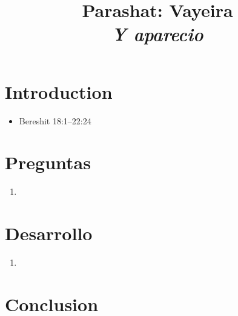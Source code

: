 \documentclass[conference]{IEEEtran}
\title{Parashat: Vayeira\\ \textit{Y aparecio}}
\author{\IEEEauthorblockN{Kunst, James Jules Waldemar}
\IEEEauthorblockA{Bet-Melej Haba}}
\begin{document}
\maketitle


\section{Introduction}
\begin{itemize}
\item
Bereshit 18:1–22:24
\end{itemize}


\section{Preguntas}

\begin{enumerate}
\item
\end{enumerate}



\section{Desarrollo}
\begin{enumerate}
 \item
\end{enumerate}




\section{Conclusion}









\end{document}
